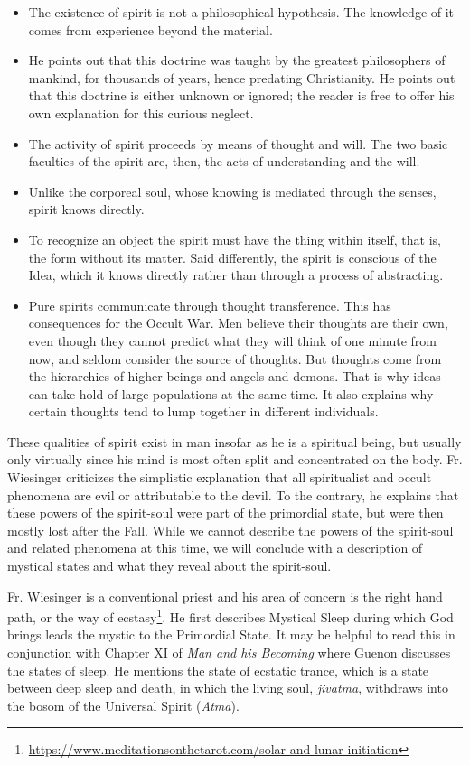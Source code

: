 \begin{itemize}
\item The existence of spirit is not a philosophical hypothesis. The knowledge of it comes from experience beyond the material. 
\item He points out that this doctrine was taught by the greatest philosophers of mankind, for thousands of years, hence predating Christianity. He points out that this doctrine is either unknown or ignored; the reader is free to offer his own explanation for this curious neglect. 
\item The activity of spirit proceeds by means of thought and will. The two basic faculties of the spirit are, then, the acts of understanding and the will. 
\item Unlike the corporeal soul, whose knowing is mediated through the senses, spirit knows directly. 
\item To recognize an object the spirit must have the thing within itself, that is, the form without its matter. Said differently, the spirit is conscious of the Idea, which it knows directly rather than through a process of abstracting. 
\item Pure spirits communicate through thought transference. This has consequences for the Occult War. Men believe their thoughts are their own, even though they cannot predict what they will think of one minute from now, and seldom consider the source of thoughts. But thoughts come from the hierarchies of higher beings and angels and demons. That is why ideas can take hold of large populations at the same time. It also explains why certain thoughts tend to lump together in different individuals. 
\end{itemize}
These qualities of spirit exist in man insofar as he is a spiritual being, but usually only virtually since his mind is most often split and concentrated on the body. Fr. Wiesinger criticizes the simplistic explanation that all spiritualist and occult phenomena are evil or attributable to the devil. To the contrary, he explains that these powers of the spirit-soul were part of the primordial state, but were then mostly lost after the Fall. While we cannot describe the powers of the spirit-soul and related phenomena at this time, we will conclude with a description of mystical states and what they reveal about the spirit-soul.

Fr. Wiesinger is a conventional priest and his area of concern is the right hand path, or the way of ecstasy\footnote{\url{https://www.meditationsonthetarot.com/solar-and-lunar-initiation}}. He first describes Mystical Sleep during which God brings leads the mystic to the Primordial State. It may be helpful to read this in conjunction with Chapter XI of \emph{Man and his Becoming} where Guenon discusses the states of sleep. He mentions the state of ecstatic trance, which is a state between deep sleep and death, in which the living soul, \emph{jivatma}, withdraws into the bosom of the Universal Spirit (\emph{Atma}).

